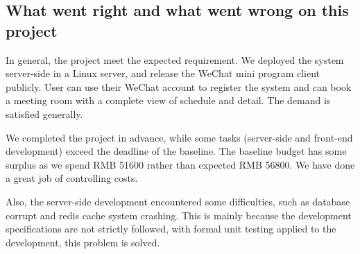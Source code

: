 \documentclass[runningheads]{llncs}
\begin{document}
\subsection{What went right and what went wrong on this project}
In general, the project meet the expected requirement. We deployed the system server-side in a Linux server, and release the WeChat mini program client publicly. User can use their WeChat account to register the system and can book a meeting room with a complete view of schedule and detail. The demand is satisfied generally.

We completed the project in advance, while some tasks (server-side and front-end development) exceed the deadline of the baseline. The baseline budget has some surplus as we spend RMB 51600 rather than expected RMB 56800. We have done a great job of controlling costs.

Also, the server-side development encountered some difficulties, such as database corrupt and redis cache system crashing. This is mainly because the development specifications are not strictly followed, with formal unit testing applied to the development, this problem is solved.
\end{document}
